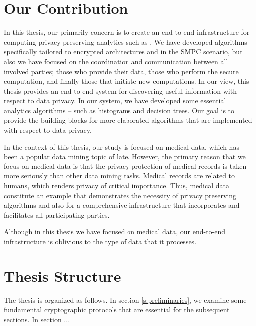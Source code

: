 
\section{Our Contribution}\label{s:our-contribution}
In this thesis, our primarily concern is to create an end-to-end infrastructure for computing privacy preserving analytics such as \cite{lindell2000privacy, agrawal2000privacy}.
We have developed algorithms specifically tailored to encrypted architectures and in the SMPC scenario, but also we have focused on the coordination and communication between all involved parties; those who provide their data, those who perform the secure computation, and finally those that initiate new computations.
In our view, this thesis provides an end-to-end system for discovering useful information with respect to data privacy.
In our system, we have developed some essential analytics algorithms -- such as histograms and decision trees.
Our goal is to provide the building blocks for more elaborated algorithms that are implemented with respect to data privacy.


In the context of this thesis, our study is focused on medical data, which has been a popular data mining topic of late.
However, the primary reason that we focus on medical data is that the privacy protection of medical records is taken more seriously than other data mining tasks.
Medical records are related to humans, which renders privacy of critical importance.
Thus, medical data constitute an example that demonstrates the necessity of privacy preserving algorithms and also for a comprehensive infrastructure that incorporates and facilitates all participating parties.


Although in this thesis we have focused on medical data, our end-to-end infrastructure is oblivious to the type of data that it processes.






\section{Thesis Structure}\label{s:thesis-structure}
The thesis is organized as follows.
In section \ref{s:preliminaries}, we examine some fundamental cryptographic protocols that are essential for the subsequent sections.
In section ...



